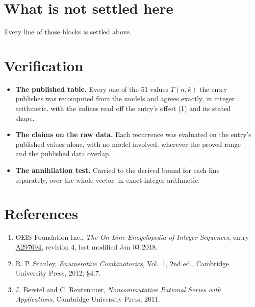 \documentclass[11pt]{article}
\theoremstyle{definition}
\begin{document}
\section{What is not settled here}

Every line of those blocks is settled above.

\section{Verification}

\begin{itemize}

\item {\bfseries The published table.} Every one of the 51 values $T(n,k)$ the entry publishes was recomputed from the models and agrees exactly, in integer arithmetic, with the indices read off the entry's offset (1) and its stated shape.

\item {\bfseries The claims on the raw data.} Each recurrence was evaluated on the entry's published values alone, with no model involved, wherever the proved range and the published data overlap.

\item {\bfseries The annihilation test.} Carried to the derived bound for each line separately, over the whole vector, in exact integer arithmetic.

\end{itemize}

\section{References}

\begin{enumerate}

\item OEIS Foundation Inc., \emph{The On-Line Encyclopedia of Integer Sequences}, entry \href{https://oeis.org/A297694}{A297694}, revision 4, last modified Jan 03 2018.

\item R. P. Stanley, \emph{Enumerative Combinatorics}, Vol.~1, 2nd ed., Cambridge University Press, 2012; \S4.7.

\item J. Berstel and C. Reutenauer, \emph{Noncommutative Rational Series with Applications}, Cambridge University Press, 2011.

\end{enumerate}
\end{document}
